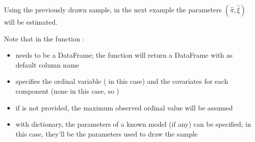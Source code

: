 \documentclass[letterpaper,10pt,english]{sphinxmanual}
\begin{document}
\noindent{}

\sphinxAtStartPar
Using the previously drawn sample, in the next example the parameters \((\hat\pi, \hat\xi)\) will be estimated.

\sphinxAtStartPar
Note that in the function :
\begin{itemize}
\item {} 
\sphinxAtStartPar
{} needs to be a  DataFrame; the function  will return a DataFrame with  as default column name

\item {} 
\sphinxAtStartPar
{} specifies the ordinal variable ( in this case) and the covariates for each component (none in this case, so )

\item {} 
\sphinxAtStartPar
if  is not provided, the maximum observed ordinal value will be assumed

\item {} 
\sphinxAtStartPar
with  dictionary, the parameters of a known model (if any) can be specified; in this case, they’ll be the parameters used to draw the sample

\end{itemize}
\def\sphinxLiteralBlockLabel{\label{\detokenize{manual:id3}}}
\begin{sphinxVerbatim}[commandchars=\\\{\},numbers=left,firstnumber=1,stepnumber=1]
  
      
\end{sphinxVerbatim}
\end{document}
